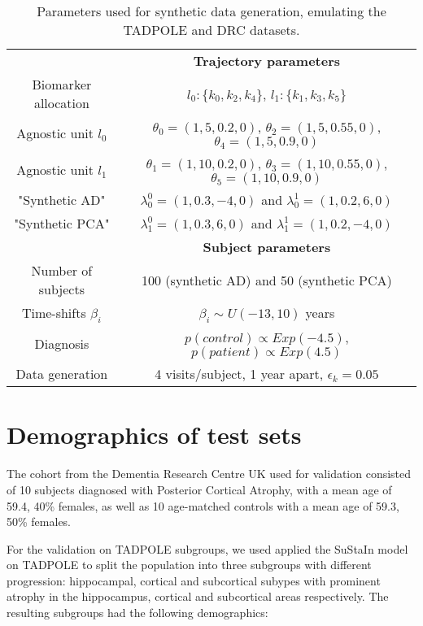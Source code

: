 \documentclass{llncs}
\begin{document}
 \begin{table}
 \centering
 \begin{tabular}{c | c}
& \textbf{Trajectory parameters} \\
 Biomarker allocation &  $l_0:\{k_0, k_2, k_4\}$, $l_1: \{k_1, k_3, k_5\}$ \\
Agnostic unit $l_0$ &  $\theta_0 = (1,5,0.2,0)$, $\theta_2 = (1,5,0.55,0)$,  $\theta_4 = (1,5,0.9,0)$  \\
Agnostic unit $l_1$ & $\theta_1 = (1,10,0.2,0)$, $\theta_3 = (1,10,0.55,0)$, $\theta_5 = (1,10,0.9,0)$ \\
  
"Synthetic AD" & $\lambda_0^0 = (1, 0.3, -4, 0)$  and $\lambda_0^1 = (1, 0.2, 6, 0)$ \\
 "Synthetic PCA" & $\lambda_1^0 = (1, 0.3, 6, 0)$ and $\lambda_1^1 = (1, 0.2, -4, 0)$ \\
\hline
& \textbf{Subject parameters} \\
 Number of subjects & 100 (synthetic AD) and 50 (synthetic PCA) \\ 
 Time-shifts $\beta_i$ & $\beta_i \sim U(-13,10)$ years \\
 Diagnosis & $p(control) \propto Exp (-4.5)$,  $p(patient) \propto Exp (4.5)$\\
 Data generation & 4 visits/subject, 1 year apart, $\epsilon_k = 0.05$\\ 
\end{tabular}
\caption{Parameters used for synthetic data generation, emulating the TADPOLE and DRC datasets.}
\label{tab:synParams}
\end{table}



\section{Demographics of test sets}

The cohort from the Dementia Research Centre UK used for validation consisted of 10 subjects diagnosed with Posterior Cortical Atrophy, with a mean age of 59.4, 40\% females, as well as 10 age-matched controls with a mean age of 59.3, 50\% females.


For the validation on TADPOLE subgroups, we used applied the SuStaIn model on TADPOLE to split the population into three subgroups with different progression: hippocampal, cortical and subcortical subypes with prominent atrophy in the hippocampus, cortical and subcortical areas respectively.
The resulting subgroups had the following demographics:
\end{document}
